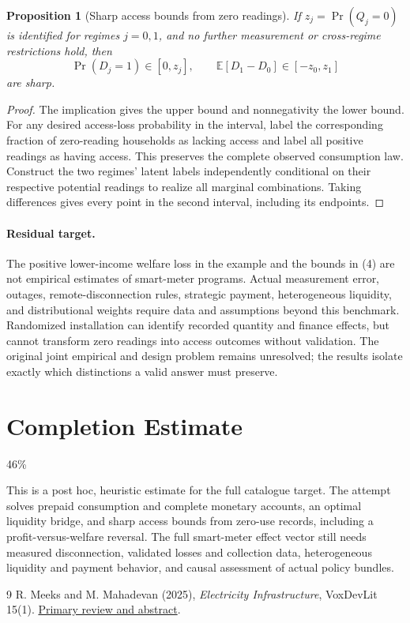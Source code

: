\documentclass[11pt]{article}
\newtheorem{proposition}[theorem]{Proposition}
\theoremstyle{definition}
\begin{document}
\begin{proposition}[Sharp access bounds from zero readings]
If $z_j=\Pr(Q_j=0)$ is identified for regimes $j=0,1$, and no further measurement or cross-regime restrictions hold, then
\[
 \Pr(D_j=1)\in[0,z_j],\qquad
 \mathbb E[D_1-D_0]\in[-z_0,z_1]
 \tag{4}
\]
are sharp.
\end{proposition}
\begin{proof}
The implication gives the upper bound and nonnegativity the lower bound. For any desired access-loss probability in the interval, label the corresponding fraction of zero-reading households as lacking access and label all positive readings as having access. This preserves the complete observed consumption law. Construct the two regimes' latent labels independently conditional on their respective potential readings to realize all marginal combinations. Taking differences gives every point in the second interval, including its endpoints.
\end{proof}

\paragraph{Residual target.}
The positive lower-income welfare loss in the example and the bounds in (4) are not empirical estimates of smart-meter programs. Actual measurement error, outages, remote-disconnection rules, strategic payment, heterogeneous liquidity, and distributional weights require data and assumptions beyond this benchmark. Randomized installation can identify recorded quantity and finance effects, but cannot transform zero readings into access outcomes without validation. The original joint empirical and design problem remains unresolved; the results isolate exactly which distinctions a valid answer must preserve.

\section{Completion Estimate}
46\%

This is a post hoc, heuristic estimate for the full catalogue target.
The attempt solves prepaid consumption and complete monetary accounts, an optimal liquidity bridge, and sharp access bounds from zero-use records, including a profit-versus-welfare reversal. The full smart-meter effect vector still needs measured disconnection, validated losses and collection data, heterogeneous liquidity and payment behavior, and causal assessment of actual policy bundles.

\begin{thebibliography}{9}
 R. Meeks and M. Mahadevan (2025), \emph{Electricity Infrastructure}, VoxDevLit 15(1). \href{https://voxdev.org/voxdevlit/electricity-infrastructure}{Primary review and abstract}.
\end{thebibliography}
\end{document}

